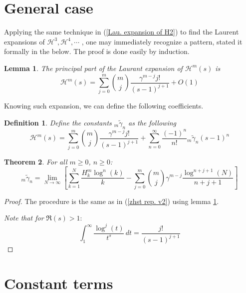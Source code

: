 \documentclass{article}
\newcommand{\pHz}[2]{\mathcal{H}^{#1}(#2)}
\newcommand{\anythharmonicStieltjescosntants}[2]{{}_{#1}\tilde{\gamma}_{#2}}
\newtheorem{theorem}{Theorem}
\newtheorem{lemma}[theorem]{Lemma}%
\newtheorem{definition}{Definition}%
\begin{document}
\section{General case}

Applying the same technique in (\ref{Lau. expansion of H2}) to find the Laurent expansions of $\mathcal{H}^3, \mathcal{H}^4 ,\cdots$ , one may immediately recognize a pattern, stated it formally in the below. The proof is done easily by induction.

\begin{lemma} \label{ The principal part of the Laurant expansion of Hm} The principal part of the Laurant expansion of $\pHz{m}{s}$ is 
    \begin{equation}
        \mathcal{H}^m(s)=\sum_{j=0}^m \binom{m}{j}\frac{\gamma^{m-j}j!}{(s-1)^{j+1}}+O(1)
    \end{equation}
\end{lemma}
Knowing such expansion, we can define the following coefficients.
\begin{definition} Define the constants $\anythharmonicStieltjescosntants{m}{n}$ as the following
\begin{equation}
    \pHz{m}{s}=\sum_{j=0}^m \binom{m}{j}\frac{\gamma^{m-j}j!}{(s-1)^{j+1}}+\sum_{n=0}^{\infty}\frac{(-1)^n}{n!}\anythharmonicStieltjescosntants{m}{n}(s-1)^n
\end{equation}

\end{definition}
\begin{theorem} For all $m\geq 0$, $n \geq 0$:
    \begin{equation}\label{general limit representation of m harmonicStieltjes n}
        \anythharmonicStieltjescosntants{m}{n}=\lim_{N\to \infty}\left[\sum_{k=1}^N \frac{H^m_k \log^n(k)}{k}-\sum_{j=0}^{m} \binom{m}{j}\gamma^{m-j}\frac{\log^{n+j+1}(N)}{n+j+1}\right]
    \end{equation}
\end{theorem}
\begin{proof}
    The procedure is the same as in (\ref{zhst rep. v2}) using lemma \ref{ The principal part of the Laurant expansion of Hm}.
    
    \textit{Note that for} $\Re(s)>1$: \begin{equation}
    \int_1^{\infty}\frac{\log^j(t)}{t^s}\, dt =\frac{j!}{(s-1)^{j+1}}
\end{equation}

\end{proof}
\section{Constant terms}
\end{document}
